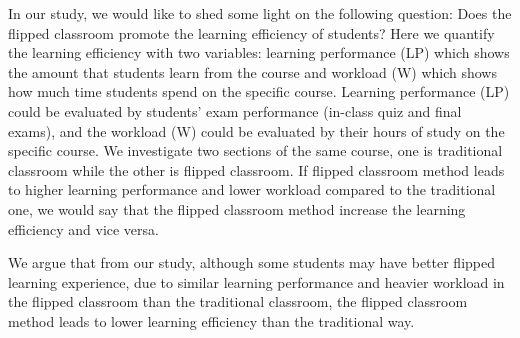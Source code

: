 \documentclass[11pt,a4paper]{article}
\begin{document}
In our study, we would like to shed some light on the following question:
Does the flipped classroom promote the learning efficiency of students?
Here we quantify the learning efficiency with two variables: learning performance (LP) which shows the amount that students learn from the course and workload (W) which shows how much time students spend on the specific course.
Learning performance (LP) could be evaluated by students' exam performance (in-class quiz and final exams), and the workload (W) could be evaluated by their hours of study on the specific course. 
We investigate two sections of the same course, one is traditional classroom while the other is flipped classroom.
If flipped classroom method leads to higher learning performance and lower workload compared to the traditional one, we would say that the flipped classroom method increase the learning efficiency and vice versa.

We argue that from our study, although some students may have better flipped learning experience, due to similar learning performance and heavier workload in the flipped classroom than the traditional classroom, the flipped classroom method leads to lower learning efficiency than the traditional way.








\end{document}
